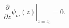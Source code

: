 \begin{equation}
\left. \frac{\partial}{\partial z} \psi_{m}(z) \right|_{z = z_{0}} = 0.
\end{equation}

